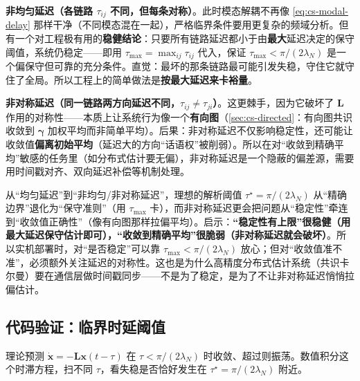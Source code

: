 \textbf{非均匀延迟（各链路 $\tau_{ij}$ 不同，但每条对称）}。此时模态解耦不再像 \cref{eq:cs-modal-delay} 那样干净（不同模态混在一起），严格临界条件要用更复杂的频域分析。但有一个对工程极有用的\textbf{稳健结论}：只要所有链路延迟都小于由\textbf{最大}延迟决定的保守阈值，系统仍稳定——即用 $\tau_{\max}=\max_{ij}\tau_{ij}$ 代入，保证 $\tau_{\max}<\pi/(2\lambda_N)$ 是一个偏保守但可靠的充分条件。直觉：最坏的那条链路最可能引发失稳，守住它就守住了全局。所以工程上的简单做法是\textbf{按最大延迟来卡裕量}。

\textbf{非对称延迟（同一链路两方向延迟不同，$\tau_{ij}\ne\tau_{ji}$）}。这更棘手，因为它破坏了 $\mathbf{L}$ 作用的对称性——本质上让系统行为像一个\textbf{有向图}（\cref{sec:cs-directed}：有向图共识收敛到 $\boldsymbol{\gamma}$ 加权平均而非简单平均）。后果：非对称延迟不仅影响稳定性，还可能让收敛值\textbf{偏离初始平均}（延迟大的方向“话语权”被削弱）。所以在对“收敛到精确平均”敏感的任务里（如分布式估计要无偏），非对称延迟是一个隐蔽的偏差源，需要用时间戳对齐、双向延迟补偿等机制处理。

\begin{insight}[两个延迟结论稳健性不同]\label{ins:cs-delay-robust}
从“均匀延迟”到“非均匀/非对称延迟”，理想的解析阈值 $\tau^\star=\pi/(2\lambda_N)$ 从“精确边界”退化为“保守准则”（用 $\tau_{\max}$ 卡），而非对称延迟更会把问题从“稳定性”牵连到“收敛值正确性”（像有向图那样拉偏平均）。启示：\textbf{“稳定性有上限”很稳健（用最大延迟保守估计即可），“收敛到精确平均”很脆弱（非对称延迟就会破坏）}。所以实机部署时，对“是否稳定”可以靠 $\tau_{\max}<\pi/(2\lambda_N)$ 放心；但对“收敛值准不准”，必须额外关注延迟的对称性。这也是为什么高精度分布式估计系统（共识卡尔曼）要在通信层做时间戳同步——不是为了稳定，是为了不让非对称延迟悄悄拉偏估计。
\end{insight}

\subsection{代码验证：临界时延阈值}
\label{sec:cs-delay-code}

理论预测 $\dot{\mathbf{x}}=-\mathbf{L}\mathbf{x}(t-\tau)$ 在 $\tau<\pi/(2\lambda_N)$ 时收敛、超过则振荡。数值积分这个时滞方程，扫不同 $\tau$，看失稳是否恰好发生在 $\tau^\star=\pi/(2\lambda_N)$ 附近。

